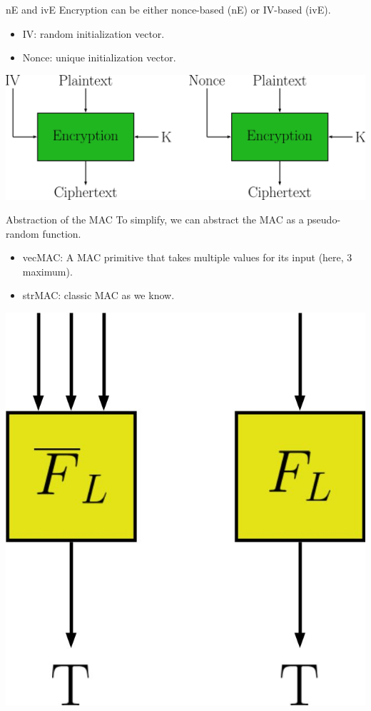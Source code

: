\documentclass[11pt]{beamer}
\begin{document}
\begin{frame}{nE and ivE}
Encryption can be either nonce-based (nE) or IV-based (ivE).

\begin{itemize}
\item IV: random initialization vector.
\item Nonce: unique initialization vector.
\end{itemize}
\begin{center}
\includegraphics[scale=0.10]{ivnonce.jpg}
\end{center}
\end{frame}

\begin{frame}{Abstraction of the MAC}
To simplify, we can abstract the MAC as a pseudo-random function.
\begin{itemize}
\item vecMAC: A MAC primitive that takes multiple values for its input (here, 3 maximum).
\item strMAC: classic MAC as we know.
\end{itemize}

\begin{center}
\includegraphics[scale=0.15]{macabstraction.jpg}
\end{center}
\end{frame}
\end{document}

